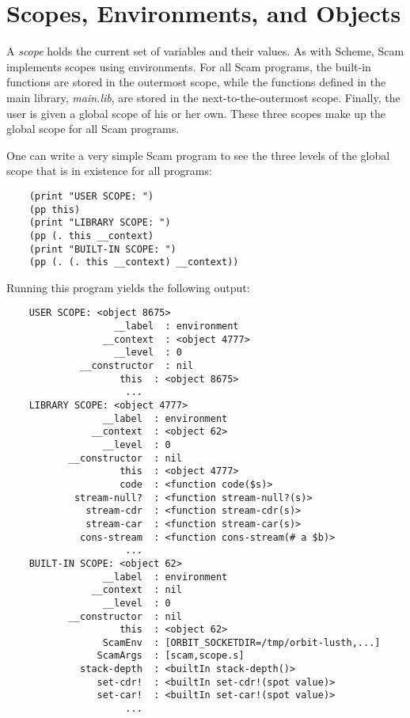 \chapter{Scopes, Environments, and Objects}
\label{ScopesEnvironmentsObjects}

A {\it scope} holds the current set of variables and their values.
As with Scheme, Scam implements scopes using environments.
For all Scam programs, the built-in functions are stored
in the outermost scope, while the functions defined
in the main library, {\it main.lib}, are stored in the next-to-the-outermost
scope. Finally, the user is given a global scope of his or her own.
These three scopes make up the global scope for all 
Scam programs.

One can write a very simple Scam program to see the three
levels of the global scope that is in existence for all programs:

\begin{verbatim}
    (print "USER SCOPE: ")
    (pp this)
    (print "LIBRARY SCOPE: ")
    (pp (. this __context)
    (print "BUILT-IN SCOPE: ")
    (pp (. (. this __context) __context))
\end{verbatim}

Running this program yields the following output:

\begin{verbatim}
    USER SCOPE: <object 8675>
                   __label  : environment
                 __context  : <object 4777>
                   __level  : 0
             __constructor  : nil
                    this  : <object 8675>
                     ...
    LIBRARY SCOPE: <object 4777>
                 __label  : environment
               __context  : <object 62>
                 __level  : 0
           __constructor  : nil
                    this  : <object 4777>
                    code  : <function code($s)>
            stream-null?  : <function stream-null?(s)>
              stream-cdr  : <function stream-cdr(s)>
              stream-car  : <function stream-car(s)>
             cons-stream  : <function cons-stream(# a $b)>
                     ...
    BUILT-IN SCOPE: <object 62>
                 __label  : environment
               __context  : nil
                 __level  : 0
           __constructor  : nil
                    this  : <object 62>
                 ScamEnv  : [ORBIT_SOCKETDIR=/tmp/orbit-lusth,...]
                ScamArgs  : [scam,scope.s]
             stack-depth  : <builtIn stack-depth()>
                set-cdr!  : <builtIn set-cdr!(spot value)>
                set-car!  : <builtIn set-car!(spot value)>
                     ...
\end{verbatim}

